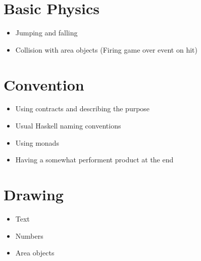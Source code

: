 \documentclass[a4paper, 10pt]{article}
\begin{document}
\section{Basic Physics}
\begin{itemize}
\item Jumping and falling
\item Collision with area objects (Firing game over event on hit)
\end{itemize}

\section{Convention}
\begin{itemize}
\item Using contracts and describing the purpose
\item Usual Haskell naming conventions
\item Using monads
\item Having a somewhat performent product at the end
\end{itemize}

\section{Drawing}
\begin{itemize}
\item Text
\item Numbers
\item Area objects
\end{itemize}
\bigskip
\end{document}
